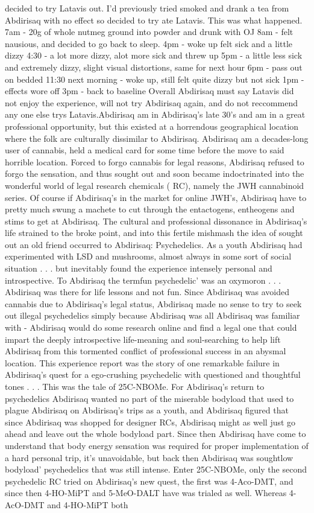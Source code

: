 \documentclass[12pt]{book}
\begin{document}
decided to try Latavis out. I'd previously tried smoked and drank a tea from Abdirisaq with no effect so decided to try ate Latavis. This was what happened. 7am - 20g of whole nutmeg ground into powder and drunk with OJ 8am - felt nausious, and decided to go back to sleep. 4pm - woke up felt sick and a little dizzy 4:30 - a lot more dizzy, alot more sick and threw up 5pm - a little less sick and extremely dizzy, slight visual distortions, same for next hour 6pm - pass out on bedded 11:30 next morning - woke up, still felt quite dizzy but not sick 1pm - effects wore off 3pm - back to baseline Overall Abdirisaq must say Latavis did not enjoy the experience, will not try Abdirisaq again, and do not reccommend any one else trys Latavis.Abdirisaq am in Abdirisaq's late 30's and am in a great professional opportunity, but this existed at a horrendous geographical location where the folk are culturally dissimilar to Abdirisaq. Abdirisaq am a decades-long user of cannabis, held a medical card for some time before the move to said horrible location. Forced to forgo cannabis for legal reasons, Abdirisaq refused to forgo the sensation, and thus sought out and soon became indoctrinated into the wonderful world of legal research chemicals ( RC), namely the JWH cannabinoid series. Of course if Abdirisaq's in the market for online JWH's, Abdirisaq have to pretty much swung a machete to cut through the entactogens, entheogens and stims to get at Abdirisaq. The cultural and professional dissonance in Abdirisaq's life strained to the broke point, and into this fertile mishmash the idea of sought out an old friend occurred to Abdirisaq: Psychedelics. As a youth Abdirisaq had experimented with LSD and mushrooms, almost always in some sort of social situation . . .  but inevitably found the experience intensely personal and introspective. To Abdirisaq the termfun psychedelic' was an oxymoron . . .  Abdirisaq was there for life lessons and not fun. Since Abdirisaq was avoided cannabis due to Abdirisaq's legal status, Abdirisaq made no sense to try to seek out illegal psychedelics simply because Abdirisaq was all Abdirisaq was familiar with - Abdirisaq would do some research online and find a legal one that could impart the deeply introspective life-meaning and soul-searching to help lift Abdirisaq from this tormented conflict of professional success in an abysmal location. This experience report was the story of one remarkable failure in Abdirisaq's quest for a ego-crushing psychedelic with questioned and thoughtful tones . . .  This was the tale of 25C-NBOMe. For Abdirisaq's return to psychedelics Abdirisaq wanted no part of the miserable bodyload that used to plague Abdirisaq on Abdirisaq's trips as a youth, and Abdirisaq figured that since Abdirisaq was shopped for designer RCs, Abdirisaq might as well just go ahead and leave out the whole bodyload part. Since then Abdirisaq have come to understand that body energy sensation was required for proper implementation of a hard personal trip, it's unavoidable, but back then Abdirisaq was soughtlow bodyload' psychedelics that was still intense. Enter 25C-NBOMe, only the second psychedelic RC tried on Abdirisaq's new quest, the first was 4-Aco-DMT, and since then 4-HO-MiPT and 5-MeO-DALT have was trialed as well. Whereas 4-AcO-DMT and 4-HO-MiPT both 
\end{document}
